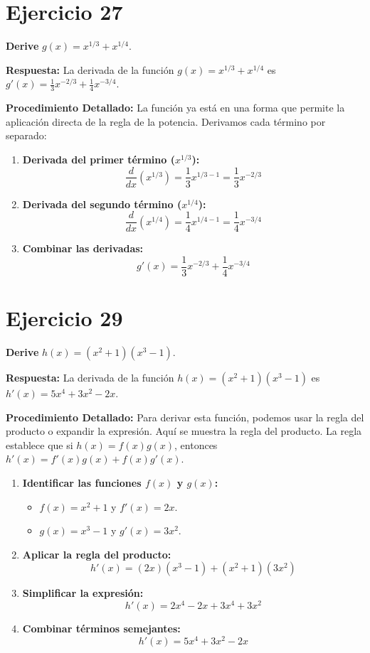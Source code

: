 \documentclass[12pt, a4paper]{article}
\begin{document}
\section{Ejercicio 27}
\textbf{Derive} $g(x) = x^{1/3} + x^{1/4}$.

\textbf{Respuesta:}
La derivada de la función $g(x) = x^{1/3} + x^{1/4}$ es $g'(x) = \frac{1}{3}x^{-2/3} + \frac{1}{4}x^{-3/4}$.

\textbf{Procedimiento Detallado:}
La función ya está en una forma que permite la aplicación directa de la regla de la potencia. Derivamos cada término por separado:
\begin{enumerate}
    \item \textbf{Derivada del primer término ($x^{1/3}$):}
    \[\frac{d}{dx}(x^{1/3}) = \frac{1}{3}x^{1/3-1} = \frac{1}{3}x^{-2/3}\]
    \item \textbf{Derivada del segundo término ($x^{1/4}$):}
    \[\frac{d}{dx}(x^{1/4}) = \frac{1}{4}x^{1/4-1} = \frac{1}{4}x^{-3/4}\]
    \item \textbf{Combinar las derivadas:}
    \[g'(x)=\frac{1}{3}x^{-2/3}+\frac{1}{4}x^{-3/4}\]
\end{enumerate}

\section{Ejercicio 29}
\textbf{Derive} $h(x) = (x^2+1)(x^3-1)$.

\textbf{Respuesta:}
La derivada de la función $h(x) = (x^2+1)(x^3-1)$ es $h'(x) = 5x^4+3x^2-2x$.

\textbf{Procedimiento Detallado:}
Para derivar esta función, podemos usar la regla del producto o expandir la expresión. Aquí se muestra la regla del producto. La regla establece que si $h(x)=f(x)g(x)$, entonces $h'(x)=f'(x)g(x)+f(x)g'(x)$.
\begin{enumerate}
    \item \textbf{Identificar las funciones $f(x)$ y $g(x)$:}
    \begin{itemize}
        \item $f(x)=x^2+1$ y $f'(x)=2x$.
        \item $g(x)=x^3-1$ y $g'(x)=3x^2$.
    \end{itemize}
    \item \textbf{Aplicar la regla del producto:}
    \[h'(x)=(2x)(x^3-1)+(x^2+1)(3x^2)\]
    \item \textbf{Simplificar la expresión:}
    \[h'(x)=2x^4-2x+3x^4+3x^2\]
    \item \textbf{Combinar términos semejantes:}
    \[h'(x)=5x^4+3x^2-2x\]
\end{enumerate}
\end{document}
